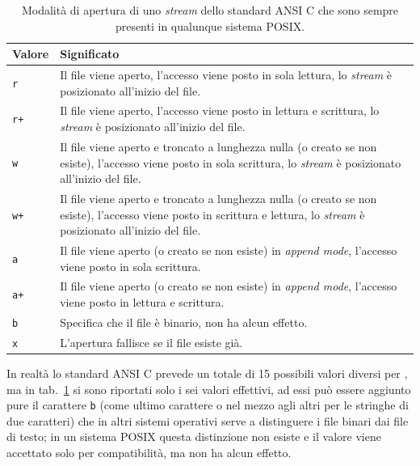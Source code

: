\begin{table}[htb]
  \centering
  \footnotesize
  \begin{tabular}[c]{|l|p{8cm}|}
    \hline
    \textbf{Valore} & \textbf{Significato}\\
    \hline
    \hline
    \texttt{r} & Il file viene aperto, l'accesso viene posto in sola
                 lettura, lo \textit{stream} è posizionato all'inizio del
                 file.\\ 
    \texttt{r+}& Il file viene aperto, l'accesso viene posto in lettura e
                 scrittura, lo \textit{stream} è posizionato all'inizio del
                 file.\\ 
    \texttt{w} & Il file viene aperto e troncato a lunghezza nulla (o
                 creato se non esiste), l'accesso viene posto in sola
                 scrittura, lo \textit{stream} è posizionato all'inizio del
                 file.\\ 
    \texttt{w+}& Il file viene aperto e troncato a lunghezza nulla (o
                 creato se non esiste), l'accesso viene posto in scrittura e
                 lettura, lo \textit{stream} è posizionato all'inizio del
                 file.\\ 
    \texttt{a} & Il file viene aperto (o creato se non esiste) in
                 \textit{append mode}, l'accesso viene posto in sola
                 scrittura.\\
    \texttt{a+}& Il file viene aperto (o creato se non esiste) in
                 \textit{append mode}, l'accesso viene posto in lettura e
                 scrittura.\\
    \hline
    \texttt{b} & Specifica che il file è binario, non ha alcun effetto. \\
    \texttt{x} & L'apertura fallisce se il file esiste già. \\
    \hline
  \end{tabular}
  \caption{Modalità di apertura di uno \textit{stream} dello standard ANSI C
    che sono sempre presenti in qualunque sistema POSIX.}
  \label{tab:file_fopen_mode}
\end{table}

In realtà lo standard ANSI C prevede un totale di 15 possibili valori
diversi per , ma in tab.~\ref{tab:file_fopen_mode} si sono
riportati solo i sei valori effettivi, ad essi può essere aggiunto pure
il carattere \texttt{b} (come ultimo carattere o nel mezzo agli altri per
le stringhe di due caratteri) che in altri sistemi operativi serve a
distinguere i file binari dai file di testo; in un sistema POSIX questa
distinzione non esiste e il valore viene accettato solo per
compatibilità, ma non ha alcun effetto.

